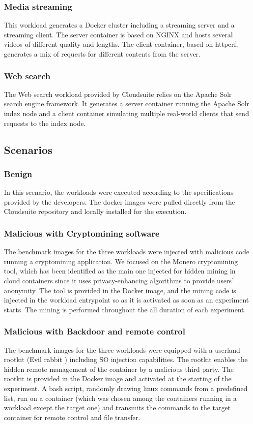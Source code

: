 \subsubsection{Media streaming}
This workload generates a Docker cluster including a streaming server and a streaming client. The server container is based on NGINX and hosts several videos of different quality and lengths. The client container, based on httperf, generates a mix of requests for different contents from the server.

\subsubsection{Web search}
The Web search workload provided by Cloudsuite relies on the Apache Solr search engine framework. It generates a server container running the Apache Solr index node and a client container simulating multiple real-world clients that send requests to the index node.


\subsection{Scenarios}
\subsubsection{Benign}
In this scenario, the workloads were executed according to the specifications provided by the developers. The docker images were pulled directly from the Cloudsuite repository and locally installed for the execution.

\subsubsection{Malicious with Cryptomining software}
The benchmark images for the three workloads were injected with malicious code running a cryptomining application. We focused on the Monero cryptomining tool, which has been identified as the main one injected for hidden mining in cloud containers since it uses privacy-enhancing algorithms to provide users' anonymity. The tool is provided in the Docker image, and the mining code is injected in the workload entrypoint so as it is activated as soon as an experiment starts. The mining is performed throughout the all duration of each experiment.

\subsubsection{Malicious with Backdoor and remote control}
The benchmark images for the three workloads were equipped with a userland rootkit (Evil rabbit \cite{rootkits}) including SO injection capabilities. The rootkit enables the hidden remote management of the container by a malicious third party. The rootkit is provided in the Docker image and activated at the starting of the experiment. A bash script, randomly drawing linux commands from a predefined list, run on a container (which was chosen among the containers running in a workload except the target one) and transmits the commands to the target container for remote control and file transfer.

